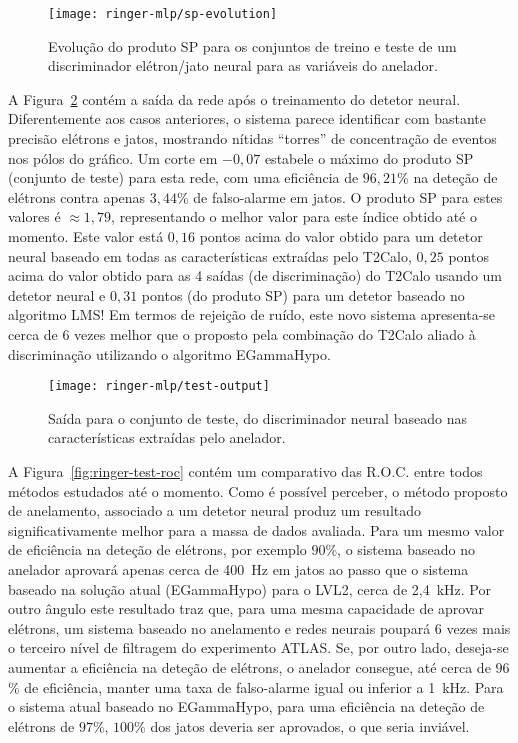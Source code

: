 \begin{figure}
\begin{center}
\texttt{[image: ringer-mlp/sp-evolution]}
\end{center}
\caption{Evolução do produto SP para os conjuntos de treino e teste de um
discriminador elétron/jato neural para as variáveis do anelador.}
\label{fig:ringer-mlp-sp}
\end{figure}

A Figura~\ref{fig:ringer-mlp-output} contém a saída da rede após o treinamento
do detetor neural. Diferentemente aos casos anteriores, o sistema parece
identificar com bastante precisão elétrons e jatos, mostrando nítidas
``torres'' de concentração de eventos nos pólos do gráfico. Um corte em
$-0,07$ estabele o máximo do produto SP (conjunto de teste) para esta rede,
com uma eficiência de $96,21$\% na deteção de elétrons contra apenas $3,44$\%
de falso-alarme em jatos. O produto SP para estes valores é $\approx 1,79$,
representando o melhor valor para este índice obtido até o momento. Este valor
está $0,16$ pontos acima do valor obtido para um detetor neural baseado em
todas as características extraídas pelo T2Calo, $0,25$ pontos acima do valor
obtido para as 4 saídas (de discriminação) do T2Calo usando um detetor neural
e $0,31$ pontos (do produto SP) para um detetor baseado no algoritmo LMS! Em
termos de rejeição de ruído, este novo sistema apresenta-se cerca de 6 vezes
melhor que o proposto pela combinação do T2Calo aliado à discriminação
utilizando o algoritmo EGammaHypo.

\begin{figure}
\begin{center}
\texttt{[image: ringer-mlp/test-output]}
\end{center}
\caption{Saída para o conjunto de teste, do discriminador neural baseado nas
características extraídas pelo anelador.}
\label{fig:ringer-mlp-output}
\end{figure}

A Figura~\ref{fig:ringer-test-roc} contém um comparativo das R.O.C. entre
todos métodos estudados até o momento. Como é possível perceber, o método
proposto de anelamento, associado a um detetor neural produz um resultado
significativamente melhor para a massa de dados avaliada. Para um mesmo valor
de eficiência na deteção de elétrons, por exemplo $90$\%, o sistema baseado no
anelador aprovará apenas cerca de 400~Hz em jatos ao passo que o sistema
baseado na solução atual (EGammaHypo) para o LVL2, cerca de 2,4~kHz. Por outro
ângulo este resultado traz que, para uma mesma capacidade de aprovar elétrons,
um sistema baseado no anelamento e redes neurais poupará 6 vezes mais o
terceiro nível de filtragem do experimento ATLAS. Se, por outro lado, deseja-se
aumentar a eficiência na deteção de elétrons, o anelador consegue, até cerca
de $96$\% de eficiência, manter uma taxa de falso-alarme igual ou inferior a
1~kHz. Para o sistema atual baseado no EGammaHypo, para uma eficiência na
deteção de elétrons de $97$\%, $100$\% dos jatos deveria ser aprovados, o que
seria inviável.

